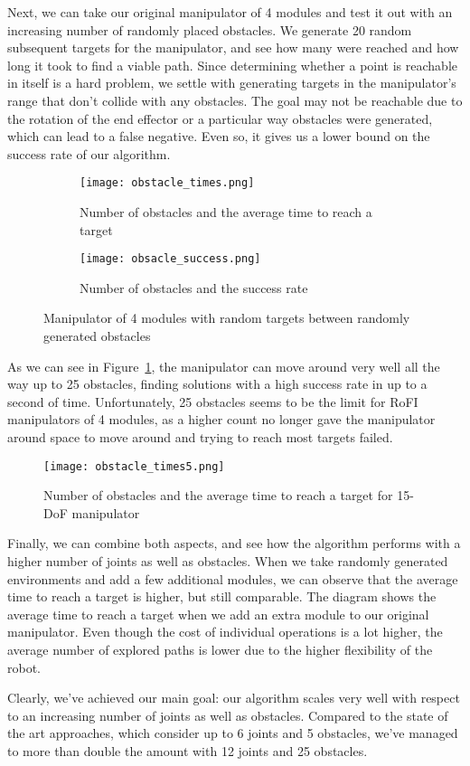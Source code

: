 Next, we can take our original manipulator of 4 modules and test it out with an increasing number of randomly placed obstacles. We generate 20 random subsequent targets for the manipulator, and see how many were reached and how long it took to find a viable path. Since determining whether a point is reachable in itself is a hard problem, we settle with generating targets in the manipulator's range that don't collide with any obstacles. The goal may not be reachable due to the rotation of the end effector or a particular way obstacles were generated, which can lead to a false negative. Even so, it gives us a lower bound on the success rate of our algorithm.

\begin{figure}
  \centering
  \begin{subfigure}{.45\textwidth}
    \texttt{[image: obstacle\_times.png]}
    \caption{Number of obstacles and the average time to reach a target}
  \end{subfigure}
  \begin{subfigure}{0.45\textwidth}
    \texttt{[image: obsacle\_success.png]}
    \caption{Number of obstacles and the success rate}
  \end{subfigure}

  \caption{Manipulator of 4 modules with random targets between randomly generated obstacles}\label{fig:inc_obst}
\end{figure}

As we can see in Figure~\ref{fig:inc_obst}, the manipulator can move around very well all the way up to 25 obstacles, finding solutions with a high success rate in up to a second of time. Unfortunately, 25 obstacles seems to be the limit for RoFI manipulators of 4 modules, as a higher count no longer gave the manipulator around space to move around and trying to reach most targets failed.

\begin{wrapfigure}{r}{0.4\textwidth}
  \centering
  \texttt{[image: obstacle\_times5.png]}
  \caption{Number of obstacles and the average time to reach a target for 15-DoF manipulator}
\end{wrapfigure}

Finally, we can combine both aspects, and see how the algorithm performs with a higher number of joints as well as obstacles. When we take randomly generated environments and add a few additional modules, we can observe that the average time to reach a target is higher, but still comparable. The diagram shows the average time to reach a target when we add an extra module to our original manipulator. Even though the cost of individual operations is a lot higher, the average number of explored paths is lower due to the higher flexibility of the robot.

Clearly, we've achieved our main goal: our algorithm scales very well with respect to an increasing number of joints as well as obstacles. Compared to the state of the art approaches, which consider up to 6 joints and 5 obstacles, we've managed to more than double the amount with 12 joints and 25 obstacles.
